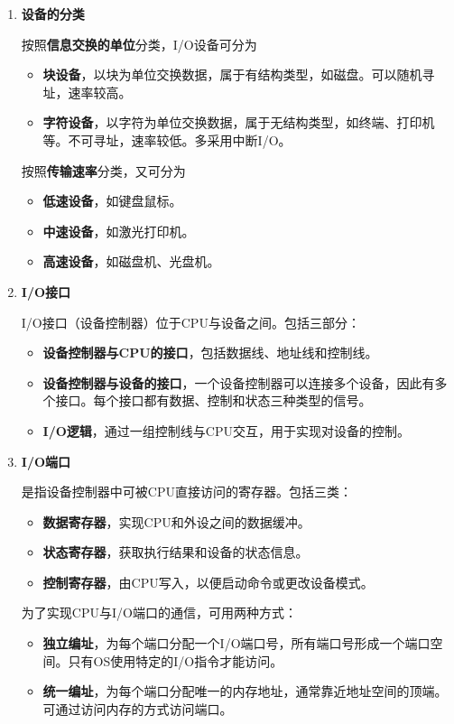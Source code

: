\documentclass[12pt, a4paper, oneside]{ctexart}
\begin{document}
\begin{enumerate}
  \item {\bf 设备的分类}
  
  按照\textbf{信息交换的单位}分类，I/O设备可分为
  \begin{itemize}
    \item {\bf 块设备}，以块为单位交换数据，属于有结构类型，如磁盘。可以随机寻址，速率较高。
    \item {\bf 字符设备}，以字符为单位交换数据，属于无结构类型，如终端、打印机等。不可寻址，速率较低。多采用中断I/O。
  \end{itemize}
  
  按照\textbf{传输速率}分类，又可分为
  \begin{itemize}
    \item {\bf 低速设备}，如键盘鼠标。
    \item {\bf 中速设备}，如激光打印机。
    \item {\bf 高速设备}，如磁盘机、光盘机。
  \end{itemize}

  \item {\bf I/O接口}
  
  I/O接口（设备控制器）位于CPU与设备之间。包括三部分：
  \begin{itemize}
    \item {\bf 设备控制器与CPU的接口}，包括数据线、地址线和控制线。
    \item {\bf 设备控制器与设备的接口}，一个设备控制器可以连接多个设备，因此有多个接口。每个接口都有数据、控制和状态三种类型的信号。
    \item {\bf I/O逻辑}，通过一组控制线与CPU交互，用于实现对设备的控制。
  \end{itemize}

  \item {\bf I/O端口}
  
  是指设备控制器中可被CPU直接访问的寄存器。包括三类：
  \begin{itemize}
    \item {\bf 数据寄存器}，实现CPU和外设之间的数据缓冲。
    \item {\bf 状态寄存器}，获取执行结果和设备的状态信息。
    \item {\bf 控制寄存器}，由CPU写入，以便启动命令或更改设备模式。
  \end{itemize}

  为了实现CPU与I/O端口的通信，可用两种方式：
  \begin{itemize}
    \item {\bf 独立编址}，为每个端口分配一个I/O端口号，所有端口号形成一个端口空间。只有OS使用特定的I/O指令才能访问。
    \item {\bf 统一编址}，为每个端口分配唯一的内存地址，通常靠近地址空间的顶端。可通过访问内存的方式访问端口。
  \end{itemize}


\end{enumerate}
\end{document}

